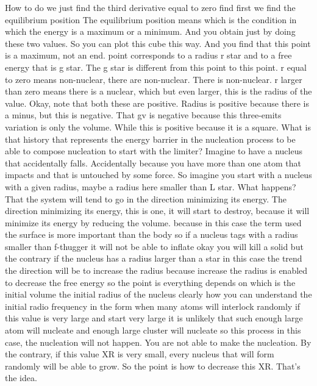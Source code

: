 How to do we just find the third derivative equal to zero find first we find the equilibrium position The equilibrium position means which is the condition in which the energy is a maximum or a minimum. And you obtain just by doing these two values. So you can plot this cube this way. And you find that this point is a maximum, not an end. point corresponds to a radius r star and to a free energy that is g star. The g star is different from this point to this point. r equal to zero means non-nuclear, there are non-nuclear. There is non-nuclear. r larger than zero means there is a nuclear, which but even larger, this is the radius of the value. Okay, note that both these are positive. Radius is positive because there is a minus, but this is negative. That gv is negative because this three-emits variation is only the volume. While this is positive because it is a square. What is that history that represents the energy barrier in the nucleation process to be able to compose nucleation to start with the limiter? Imagine to have a nucleus that accidentally falls. Accidentally because you have more than one atom that impacts and that is untouched by some force. So imagine you start with a nucleus with a given radius, maybe a radius here smaller than L star. What happens? That the system will tend to go in the direction minimizing its energy. The direction minimizing its energy, this is one, it will start to destroy, because it will minimize its energy by reducing the volume. because in this case the term used the surface is more important than the body so if a nucleus tags with a radius smaller than f-thugger it will not be able to inflate okay you will kill a solid but the contrary if the nucleus has a radius larger than a star in this case the trend the direction will be to increase the radius because increase the radius is enabled to decrease the free energy so the point is everything depends on which is the initial volume the initial radius of the nucleus clearly how you can understand the initial radio frequency in the form when many atoms will interlock randomly if this value is very large and start very large it is unlikely that such enough large atom will nucleate and enough large cluster will nucleate so this process in this case, the nucleation will not happen. You are not able to make the nucleation. By the contrary, if this value XR is very small, every nucleus that will form randomly will be able to grow. So the point is how to decrease this XR. That's the idea.
